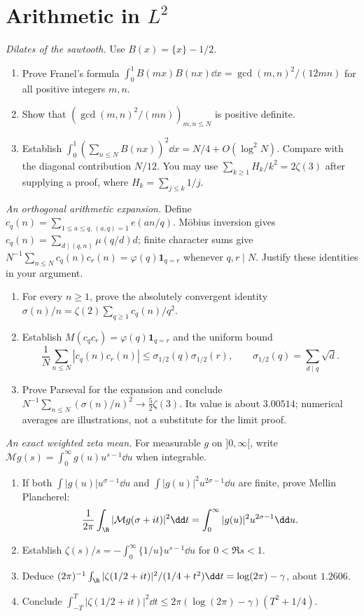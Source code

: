 \section{Arithmetic in \texorpdfstring{$L^2$}{L2}}
\begin{exercise}[$\star\star\star$]\label{pb:franel}
\emph{Dilates of the sawtooth.} Use $B(x)=\{x\}-1/2$.
\begin{enumerate}[label=(\alph*)]
\item Prove Franel's formula $\int_0^1B(mx)B(nx)\dd x=\gcd(m,n)^2/(12mn)$ for all positive integers $m,n$.
\item Show that $(\gcd(m,n)^2/(mn))_{m,n\le N}$ is positive definite.
\item Establish $\int_0^1(\sum_{n\le N}B(nx))^2\dd x=N/4+O(\log^2N)$. Compare with the diagonal contribution $N/12$. You may use $\sum_{k\ge1}H_k/k^2=2\zeta(3)$ after supplying a proof, where $H_k=\sum_{j\le k}1/j$.
\end{enumerate}
\end{exercise}
\begin{exercise}[$\star\star\star$]\label{pb:ramanujan}
\emph{An orthogonal arithmetic expansion.} Define $c_q(n)=\sum_{1\le a\le q,\,(a,q)=1}e(an/q)$. Möbius inversion gives $c_q(n)=\sum_{d\mid(q,n)}\mu(q/d)d$; finite character sums give $N^{-1}\sum_{n\le N}c_q(n)c_r(n)=\varphi(q)\mathbf1_{q=r}$ whenever $q,r\mid N$. Justify these identities in your argument.
\begin{enumerate}[label=(\alph*)]
\item For every $n\ge1$, prove the absolutely convergent identity $\sigma(n)/n=\zeta(2)\sum_{q\ge1}c_q(n)/q^2$.
\item Establish $M(c_qc_r)=\varphi(q)\mathbf1_{q=r}$ and the uniform bound
\[\frac1N\sum_{n\le N}|c_q(n)c_r(n)|\le\sigma_{1/2}(q)\sigma_{1/2}(r),\qquad \sigma_{1/2}(q)=\sum_{d\mid q}\sqrt d.\]
\item Prove Parseval for the expansion and conclude $N^{-1}\sum_{n\le N}(\sigma(n)/n)^2\to\tfrac52\zeta(3)$. Its value is about $3.00514$; numerical averages are illustrations, not a substitute for the limit proof.
\end{enumerate}
\end{exercise}
\begin{exercise}[$\star\star$]\label{pb:zetamellin}
\emph{An exact weighted zeta mean.} For measurable $g$ on $]0,\infty[$, write $\mathcal Mg(s)=\int_0^\infty g(u)u^{s-1}\dd u$ when integrable.
\begin{enumerate}[label=(\alph*)]
\item If both $\int|g(u)|u^{\sigma-1}\dd u$ and $\int|g(u)|^2u^{2\sigma-1}\dd u$ are finite, prove Mellin Plancherel:
\[\frac1{2\pi}\int_\R|\mathcal Mg(\sigma+it)|^2\dd t=\int_0^\infty|g(u)|^2u^{2\sigma-1}\dd u.\]
\item Establish $\zeta(s)/s=-\int_0^\infty\{1/u\}u^{s-1}\dd u$ for $0<\Re s<1$.
\item Deduce $(2\pi)^{-1}\int_\R|\zeta(1/2+it)|^2/(1/4+t^2)\dd t=\log(2\pi)-\gamma$, about $1.2606$.
\item Conclude $\int_{-T}^T|\zeta(1/2+it)|^2\dd t\le2\pi(\log(2\pi)-\gamma)(T^2+1/4)$.
\end{enumerate}
\end{exercise}
